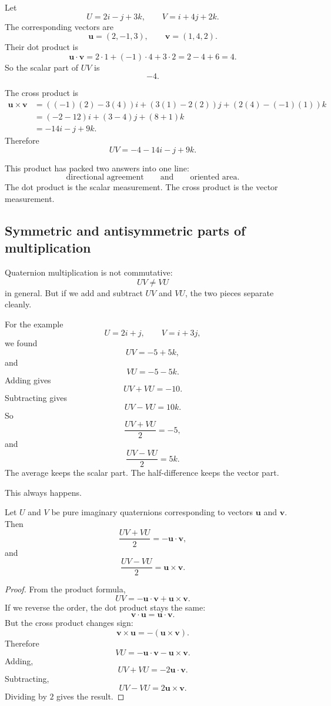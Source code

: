 \begin{example}
Let
\[
    U=2i-j+3k,
    \qquad
    V=i+4j+2k.
\]
The corresponding vectors are
\[
    \mathbf u=(2,-1,3),
    \qquad
    \mathbf v=(1,4,2).
\]
Their dot product is
\[
    \mathbf u\cdot\mathbf v
    =
    2\cdot1+(-1)\cdot4+3\cdot2
    =
    2-4+6
    =
    4.
\]
So the scalar part of \(UV\) is
\[
    -4.
\]

The cross product is
\[
\begin{aligned}
\mathbf u\times\mathbf v
&=
((-1)(2)-3(4))i
+(3(1)-2(2))j
+(2(4)-(-1)(1))k\\
&=
(-2-12)i+(3-4)j+(8+1)k\\
&=
-14i-j+9k.
\end{aligned}
\]
Therefore
\[
    UV=-4-14i-j+9k.
\]
\end{example}

This product has packed two answers into one line:
\[
    \text{directional agreement} \qquad \text{and} \qquad \text{oriented area}.
\]
The dot product is the scalar measurement.  The cross product is the vector measurement.

\subsection{Symmetric and antisymmetric parts of multiplication}

Quaternion multiplication is not commutative:
\[
    UV\neq VU
\]
in general.  But if we add and subtract \(UV\) and \(VU\), the two pieces separate cleanly.

For the example
\[
    U=2i+j,
    \qquad
    V=i+3j,
\]
we found
\[
    UV=-5+5k,
\]
and
\[
    VU=-5-5k.
\]
Adding gives
\[
    UV+VU=-10.
\]
Subtracting gives
\[
    UV-VU=10k.
\]
So
\[
    \frac{UV+VU}{2}=-5,
\]
and
\[
    \frac{UV-VU}{2}=5k.
\]
The average keeps the scalar part.  The half-difference keeps the vector part.

This always happens.

\begin{theorem}
Let \(U\) and \(V\) be pure imaginary quaternions corresponding to vectors
\(\mathbf u\) and \(\mathbf v\).  Then
\[
    \frac{UV+VU}{2}
    =
    -\mathbf u\cdot\mathbf v,
\]
and
\[
    \frac{UV-VU}{2}
    =
    \mathbf u\times\mathbf v.
\]
\end{theorem}

\begin{proof}
From the product formula,
\[
    UV=-\mathbf u\cdot\mathbf v+\mathbf u\times\mathbf v.
\]
If we reverse the order, the dot product stays the same:
\[
    \mathbf v\cdot\mathbf u=\mathbf u\cdot\mathbf v.
\]
But the cross product changes sign:
\[
    \mathbf v\times\mathbf u=-(\mathbf u\times\mathbf v).
\]
Therefore
\[
    VU=-\mathbf u\cdot\mathbf v-\mathbf u\times\mathbf v.
\]
Adding,
\[
    UV+VU=-2\mathbf u\cdot\mathbf v.
\]
Subtracting,
\[
    UV-VU=2\mathbf u\times\mathbf v.
\]
Dividing by \(2\) gives the result.
\end{proof}

